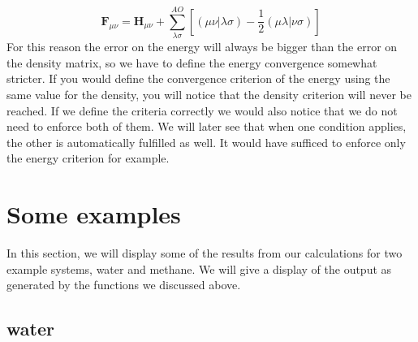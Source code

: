 \documentclass[%
    paper=A4,               %
    twoside=true,           %
    openany,              %
    parskip=full,           %
    chapterprefix=true,     %
    11pt,                   %
    headings=normal,        %
    bibliography=totoc,     %
    listof=totoc,           %
    titlepage=on,           %
    captions=tableabove,    %
    draft=false,            %
]{scrreprt}
\numberwithin{equation}{section}
\begin{document}
     \begin{equation} \label{eq: fock matrix}
         \boldsymbol{F}_{\mu\nu} = \boldsymbol{H}_{\mu\nu} + \sum^{AO}_{\lambda\sigma}[(\mu\nu|\lambda\sigma) - \frac{1}{2}(\mu\lambda|\nu\sigma)]
     \end{equation}
     For this reason the error on the energy will always be bigger than the error on the density matrix, so we have to define the energy convergence somewhat stricter. If you would define the convergence criterion of the energy using the same value for the density, you will notice that the density criterion will never be reached. If we define the criteria correctly we would also notice that we do not need to enforce both of them. We will later see that when one condition applies, the other is automatically fulfilled as well. It would have sufficed to enforce only the energy criterion for example.
     
     \section{Some examples}
     \label{sec: examples}
     In this section, we will display some of the results from our calculations for two example systems, water and methane. We will give a display of the output as generated by the functions we discussed above.
     
     \subsection{water}
     \label{subsec:water}
    
\end{document}
